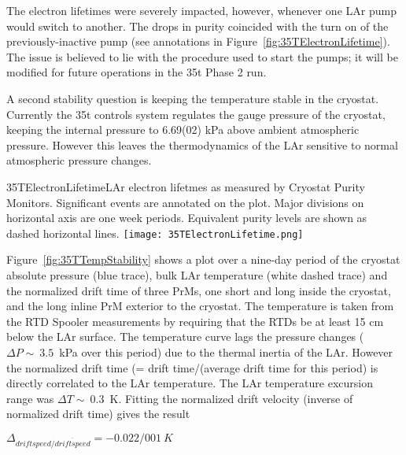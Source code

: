 The electron lifetimes were severely impacted, however, whenever one LAr pump would switch to 
another. The drops in purity coincided with the turn on of the previously-inactive pump (see annotations 
in Figure~\ref{fig:35TElectronLifetime}). The issue is believed to lie with the procedure used to start the 
pumps; it will be modified for future operations in the 35t Phase 2 run.

A second stability question is keeping the temperature stable in the cryostat. Currently the 35t controls 
system regulates the gauge pressure of the cryostat, keeping the internal pressure to 6.69(02) kPa above 
ambient atmospheric pressure. However this leaves the thermodynamics of the LAr sensitive to normal 
atmospheric pressure changes.

\begin{cdrfigure}{35TElectronLifetime}{LAr electron lifetmes as measured by 
Cryostat Purity Monitors. Significant events are annotated on the plot. Major divisions on horizontal axis 
are one week periods. Equivalent purity levels are shown as dashed horizontal lines.}
  \texttt{[image: 35TElectronLifetime.png]}
\end{cdrfigure}

Figure~\ref{fig:35TTempStability} shows a plot over a nine-day period of the cryostat absolute pressure (blue 
trace), bulk LAr temperature (white dashed trace) and the normalized drift time of three PrMs, one short 
and long inside the cryostat, and the long inline PrM exterior to the cryostat. The temperature is taken 
from the RTD Spooler measurements by requiring that the RTDs be at least 15 cm below the LAr surface. 
The temperature curve lags the pressure changes ($\Delta P \sim~3.5$~kPa over this period) due to the thermal 
inertia of the LAr. However  the normalized drift time (= drift time/(average drift time for this period) is 
directly correlated to the LAr temperature. The LAr temperature excursion range was $\Delta T \sim~0.3$~K. 
Fitting the normalized drift velocity (inverse of normalized drift time) gives the result 


 $\Delta_{driftspeed/\overline{driftspeed}} = -0.022/001~K$\\
 
